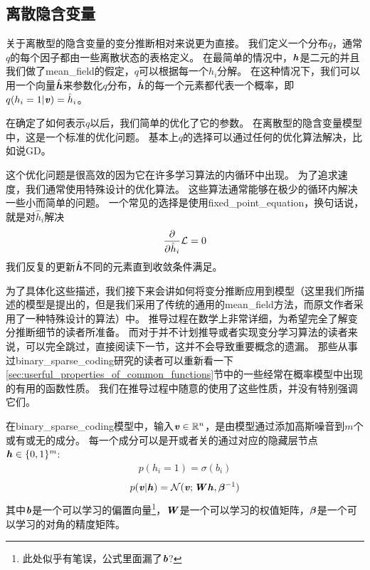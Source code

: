 \subsection{离散隐含变量}
\label{sec:discrete_latent_variables}

关于离散型的隐含变量的变分推断相对来说更为直接。
我们定义一个分布$q$，通常$q$的每个因子都由一些离散状态的表格定义。
在最简单的情况中，$\boldsymbol{\mathit{h}}$是二元的并且我们做了\gls{mean_field}的假定，$q$可以根据每一个$h_i$分解。
在这种情况下，我们可以用一个向量$\hat{\boldsymbol{\mathit{h}}}$来参数化$q$分布，$\hat{\boldsymbol{\mathit{h}}}$的每一个元素都代表一个概率，即$q(h_i = 1\vert \boldsymbol{\mathit{v}}) = \hat{h}_i$。


在确定了如何表示$q$以后，我们简单的优化了它的参数。
在离散型的隐含变量模型中，这是一个标准的优化问题。
基本上$q$的选择可以通过任何的优化算法解决，比如说\gls{GD}。


这个优化问题是很高效的因为它在许多学习算法的内循环中出现。
为了追求速度，我们通常使用特殊设计的优化算法。
这些算法通常能够在极少的循环内解决一些小而简单的问题。
一个常见的选择是使用\gls{fixed_point_equation}，换句话说，就是对$\hat{h}_i$解决
\begin{align}
	\frac{\partial}{\partial \hat{h}_i}\mathcal{L} = 0
\end{align}
我们反复的更新$\hat{\boldsymbol{\mathit{h}}}$不同的元素直到收敛条件满足。


为了具体化这些描述，我们接下来会讲如何将变分推断应用到模型（这里我们所描述的模型是\citet{henniges2010binary}提出的，但是我们采用了传统的通用的\gls{mean_field}方法，而原文作者采用了一种特殊设计的算法）中。
推导过程在数学上非常详细，为希望完全了解变分推断细节的读者所准备。
而对于并不计划推导或者实现变分学习算法的读者来说，可以完全跳过，直接阅读下一节，这并不会导致重要概念的遗漏。
那些从事过\gls{binary_sparse_coding}研究的读者可以重新看一下\ref{sec:userful_properties_of_common_functions}节中的一些经常在概率模型中出现的有用的函数性质。
我们在推导过程中随意的使用了这些性质，并没有特别强调它们。


在\gls{binary_sparse_coding}模型中，输入$\boldsymbol{\mathit{v}}\in\mathbb{R}^n$，是由模型通过添加高斯噪音到$m$个或有或无的成分。
每一个成分可以是开或者关的通过对应的隐藏层节点$\boldsymbol{\mathit{h}} \in\{0,1\}^m$:
\begin{align}
	p(h_i = 1) = \sigma(b_i)
\end{align}
\begin{align}
	p(\boldsymbol{\mathit{v}}\vert\boldsymbol{\mathit{h}}) = \mathcal{N}(\boldsymbol{\mathit{v}};\boldsymbol{\mathit{W}} \boldsymbol{\mathit{h}},{\boldsymbol{\beta}}^{-1})
\end{align}
其中$\boldsymbol{\mathit{b}}$是一个可以学习的偏置向量\footnote{此处似乎有笔误，公式里面漏了$\boldsymbol{\mathit{b}}$?}，$\boldsymbol{\mathit{W}}$是一个可以学习的权值矩阵，${\boldsymbol{\beta}}$是一个可以学习的对角的精度矩阵。


